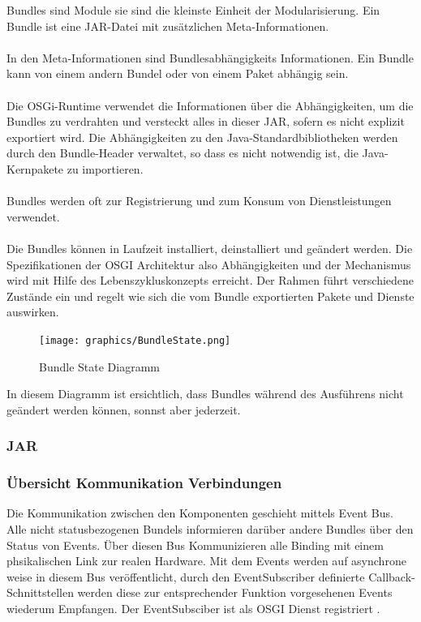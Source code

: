 Bundles sind Module sie sind die kleinste Einheit der Modularisierung. Ein Bundle ist eine JAR-Datei mit zusätzlichen Meta-Informationen.\\
\\
In den Meta-Informationen sind Bundlesabhängigkeits Informationen. Ein Bundle kann von einem andern Bundel oder von einem Paket abhängig sein.\\
\\
Die OSGi-Runtime verwendet die Informationen über die Abhängigkeiten, um die Bundles zu verdrahten und versteckt alles in dieser JAR, sofern es nicht explizit exportiert wird. Die Abhängigkeiten zu den Java-Standardbibliotheken werden durch den Bundle-Header verwaltet, so dass es nicht notwendig ist, die Java-Kernpakete zu importieren.\\
\\
Bundles werden oft zur Registrierung und zum Konsum von Dienstleistungen verwendet.\\
\\
Die Bundles können in Laufzeit installiert, deinstalliert und geändert werden. Die Spezifikationen der OSGI Architektur also Abhängigkeiten und der Mechanismus wird mit Hilfe des Lebenszykluskonzepts erreicht. Der Rahmen führt verschiedene Zustände ein und regelt wie sich die vom Bundle exportierten Pakete und Dienste auswirken. 

 \begin{figure}[H]
	\centering
	\texttt{[image: graphics/BundleState.png]}
	\caption{Bundle State Diagramm} 	
	\label{pic: BundleState}
\end{figure} 

In diesem Diagramm ist ersichtlich, dass Bundles während des Ausführens nicht geändert werden können, sonnst aber jederzeit.

\subsubsection{JAR}
\subsubsection{Übersicht Kommunikation Verbindungen}
Die Kommunikation zwischen den Komponenten geschieht mittels Event Bus. Alle nicht statusbezogenen Bundels informieren darüber andere Bundles über den Status von Events. Über diesen Bus Kommunizieren alle Binding mit einem phsikalischen Link zur realen Hardware. Mit dem Events werden auf asynchrone weise in diesem Bus veröffentlicht, durch den EventSubscriber definierte Callback-Schnittstellen werden diese zur entsprechender Funktion vorgesehenen Events wiederum Empfangen. Der EventSubsciber ist als OSGI Dienst registriert \cite{noauthor_event_nodate}.

